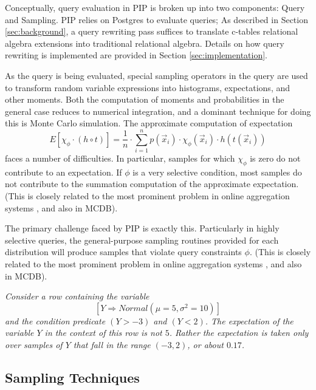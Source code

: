 Conceptually, query evaluation in PIP is broken up into two components: Query and Sampling.  PIP relies on Postgres to evaluate queries; As described in Section \ref{sec:background}, a query rewriting pass suffices to translate c-tables relational algebra extensions into traditional relational algebra.  Details on how query rewriting is implemented are provided in Section \ref{sec:implementation}.  

As the query is being evaluated, special sampling operators in the query are used to transform random variable expressions into histograms, expectations, and other moments.  Both the computation of moments and probabilities in the general case reduces to numerical integration, and a dominant technique for doing this is Monte Carlo simulation. The approximate computation of expectation
\begin{equation}
E[\chi_\phi \cdot (h \circ t)] =
\frac{1}{n} \cdot \sum_{i=1}^n p(\vec{x}_i) \cdot \chi_\phi(\vec{x}_i) \cdot
h(t(\vec{x}_i))
\end{equation}
faces a number of difficulties.  In particular, samples for which $\chi_{\phi}$ is zero do not contribute to an expectation.  If $\phi$ is a very selective condition, most samples do not contribute to the summation computation of the approximate expectation.  (This is closely related to the most prominent problem in online aggregation systems \cite{OnlineAggregation,DBO}, and also in MCDB).

The primary challenge faced by PIP is exactly this. Particularly in highly selective queries, the general-purpose sampling routines provided for each distribution will produce samples that violate query constraints $\phi$.  (This is closely related to the most prominent problem in online aggregation systems \cite{OnlineAggregation,DBO}, and also in MCDB).

\begin{example}\em 
Consider a row containing the variable 
$$[Y \Rightarrow Normal(\mu=5,\sigma^2=10)]$$
and the condition predicate $(Y > -3)$ and $(Y < 2)$.  The expectation of the variable $Y$ in the context of this row is not $5$.  Rather the expectation is taken only over samples of $Y$ that fall in the range $(-3,2)$, or about $0.17$.  
\end{example}

\subsection{Sampling Techniques}
\label{subsec:samplingTechs}

